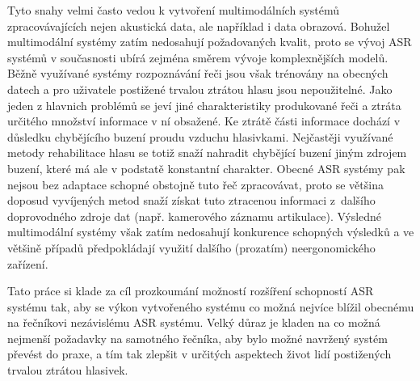 Tyto snahy velmi často vedou
k vytvoření multimodálních systémů zpracovávajících nejen akustická data, ale
například i data obrazová. %
Bohužel multimodální systémy zatím nedosahují požadovaných kvalit, proto se vývoj ASR systémů v současnosti ubírá zejména směrem vývoje komplexnějších modelů.
Běžně využívané systémy rozpoznávání řeči jsou však trénovány na obecných datech a pro uživatele postižené trvalou ztrátou hlasu jsou nepoužitelné. Jako jeden z hlavnich problémů se jeví jiné charakteristiky produkované řeči a ztráta určitého množství informace v ní obsažené. Ke ztrátě části informace dochází v důsledku chybějícího buzení  proudu vzduchu hlasivkami. Nejčastěji využívané metody rehabilitace hlasu se totiž snaží nahradit chybějící buzení  jiným zdrojem buzení, které má ale v podstatě konstantní charakter. Obecné ASR systémy pak nejsou bez adaptace schopné obstojně tuto řeč zpracovávat, proto se většina doposud vyvíjených metod snaží získat tuto ztracenou informaci z~dalšího doprovodného zdroje dat (např. kamerového záznamu artikulace). Výsledné multimodální systémy však zatím nedosahují konkurence schopných výsledků a ve většině případů předpokládají využití dalšího (prozatím) neergonomického zařízení.

Tato práce si klade za cíl prozkoumání možností rozšíření schopností ASR systému tak, aby se výkon vytvořeného systému co možná nejvíce blížil obecnému na řečníkovi nezávislému ASR systému. Velký důraz je kladen na co možná nejmenší požadavky na samotného řečníka, aby bylo možné navržený systém převést do praxe, a tím tak zlepšit v určitých aspektech život lidí postižených trvalou ztrátou hlasivek.


